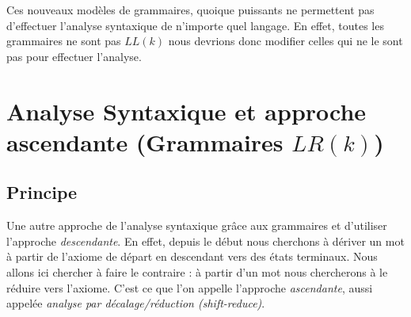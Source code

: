 

Ces nouveaux modèles de grammaires, quoique puissants ne permettent pas d'effectuer l'analyse syntaxique 
de n'importe quel langage. En effet, toutes les grammaires ne sont pas $LL(k)$ nous devrions donc 
modifier celles qui ne le sont pas pour effectuer l'analyse. 


\section{Analyse Syntaxique et approche ascendante (Grammaires $LR(k)$)}

\subsection{Principe}

Une autre approche de l'analyse syntaxique grâce aux grammaires et d'utiliser l'approche \emph{descendante}.
En effet, depuis le début nous cherchons à dériver un mot à partir de l'axiome de départ en descendant 
vers des états terminaux. Nous allons ici chercher à faire le contraire : à partir d'un mot nous chercherons 
à le réduire vers l'axiome. C'est ce que l'on appelle l'approche \emph{ascendante}, aussi appelée 
\emph{analyse par décalage/réduction (shift-reduce)}. 


